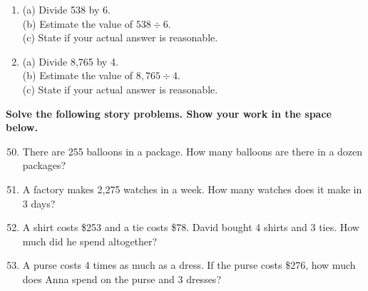 \documentclass[11pt, a4paper]{article}
\begin{document}
\begin{enumerate}[label=\arabic*.]
    \item (a) Divide 538 by 6. \hfill \text{\underline{\hspace{3.5cm}}} \\
          (b) Estimate the value of $538 \div 6$. \hfill \text{\underline{\hspace{3.5cm}}} \\
          (c) State if your actual answer is reasonable. \hfill \text{\underline{\hspace{3.5cm}}}

    \item (a) Divide 8,765 by 4. \hfill \text{\underline{\hspace{3.5cm}}} \\
          (b) Estimate the value of $8,765 \div 4$. \hfill \text{\underline{\hspace{3.5cm}}} \\
          (c) State if your actual answer is reasonable. \hfill \text{\underline{\hspace{3.5cm}}}
\end{enumerate}

\pagebreak

\textbf{Solve the following story problems. Show your work in the space below.}

\begin{enumerate}[label=\arabic*.]
    \setcounter{enumi}{49}
    \item There are 255 balloons in a package. How many balloons are there in a dozen packages?
    
    \vspace{3cm}

    \item A factory makes 2,275 watches in a week. How many watches does it make in 3 days?

    \vspace{3cm}

    \item A shirt costs \$253 and a tie costs \$78. David bought 4 shirts and 3 ties. How much did he spend altogether?

    \vspace{3cm}

    \item A purse costs 4 times as much as a dress. If the purse costs \$276, how much does Anna spend on the purse and 3 dresses?

\end{enumerate}

\pagebreak
\end{document}
